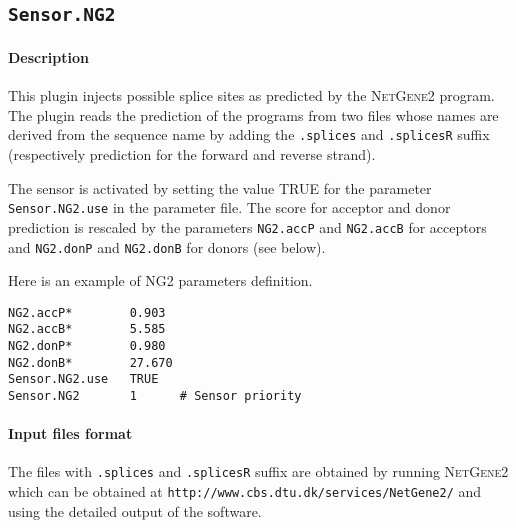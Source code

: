 
\subsection{\texttt{Sensor.NG2}}

\paragraph{Description}

This plugin injects possible splice sites as predicted by the
\textsc{NetGene2} program. The plugin reads the prediction of the
programs from two files whose names are derived from the sequence name
by adding the \texttt{.splices} and \texttt{.splicesR} suffix
(respectively prediction for the forward and reverse strand).

The sensor is activated by setting the value TRUE for the parameter
\texttt{Sensor.NG2.use} in the parameter file. The score for acceptor
and donor prediction is rescaled by the parameters {\tt NG2.accP} and
{\tt NG2.accB} for acceptors and {\tt NG2.donP} and {\tt NG2.donB} for
donors (see below).

Here is an example of NG2 parameters definition.
\begin{Verbatim}[fontsize=\small]
NG2.accP*        0.903
NG2.accB*        5.585
NG2.donP*        0.980
NG2.donB*        27.670
Sensor.NG2.use   TRUE
Sensor.NG2       1      # Sensor priority
\end{Verbatim}

\paragraph{Input files format}

The files with \texttt{.splices} and \texttt{.splicesR} suffix are
obtained by running \textsc{NetGene2} which can be obtained at
\texttt{http://www.cbs.dtu.dk/services/NetGene2/} and using the
detailed output of the software.


